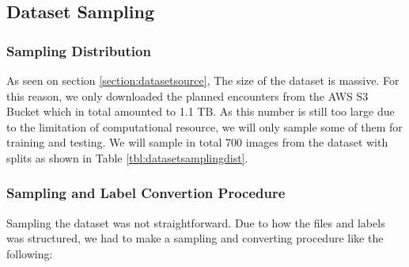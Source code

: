   \subsection{Dataset Sampling}
  \label{section:datasetsampling}
    \subsubsection{Sampling Distribution}
    As seen on section \ref{section:datasetsource}, The size of the dataset is massive.
    For this reason, we only downloaded the planned encounters from the AWS S3 Bucket which 
    in total amounted to 1.1 TB. As this number is still too large
    due to the limitation of computational resource, we will only sample some of them
    for training and testing. We will sample in total 700 images from the dataset with splits
    as shown in Table \ref{tbl:datasetsamplingdist}.
    \begin{table}[H]
      \centering
      \label{tbl:datasetsamplingdist}
      
    \end{table}
    
    \subsubsection{Sampling and Label Convertion Procedure}
    Sampling the dataset was not straightforward. Due to how the \textcite{aot_dataset} files and labels was structured,
    we had to make a sampling and converting procedure like the following:

